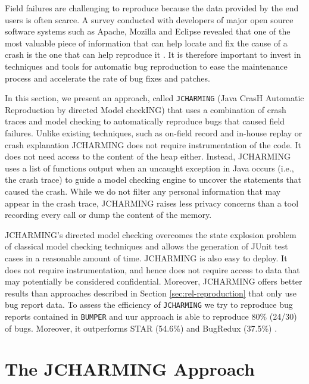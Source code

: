 

Field failures are challenging to reproduce because
the data provided by the end users is often scarce. A survey
conducted with developers of major open source software
systems such as Apache, Mozilla and Eclipse revealed that
one of the most valuable piece of information that can help
locate and fix the cause of a crash is the one that can help
reproduce it \cite{Bettenburg2008}. It is therefore important to invest in
techniques and tools for automatic bug reproduction to ease
the maintenance process and accelerate the rate of bug fixes
and patches.

In this section, we present an approach, called {\tt JCHARMING}
(Java CrasH Automatic Reproduction by directed Model
checkING) that uses a combination of crash traces and model
checking to automatically reproduce bugs that caused field
failures. Unlike existing techniques, such as on-field record and in-house replay \cite{Narayanasamy2005,Artzi2008,Jaygarl} or crash explanation \cite{Manevich2004,chandra2009snugglebug} JCHARMING does not
require instrumentation of the code. It does not need access to
the content of the heap either. Instead, JCHARMING uses a
list of functions output when an uncaught exception in Java
occurs (i.e., the crash trace) to guide a model checking engine
to uncover the statements that caused the crash. While we do not filter any personal information that may appear in the crash trace, JCHARMING  raises less privacy concerns than a tool recording every call or dump the content of the memory.

JCHARMING's directed model checking overcomes the state explosion problem of classical model checking techniques and allows the generation of JUnit test cases in a reasonable amount of time.
JCHARMING is also easy to deploy.
It does not require instrumentation, and hence does not require access to data that may potentially be considered confidential.
Moreover, JCHARMING offers better results than approaches described in Section \ref{sec:rel-reproduction} that only use bug report data.
To assess the efficiency of {\tt JCHARMING} we try to reproduce bug reports contained in {\tt BUMPER} and uur approach is able to reproduce 80\% (24/30) of bugs.
Moreover, it outperforms STAR (54.6\%) \cite{Chen2013} and BugRedux (37.5\%) \cite{Jin2012}.


\section{The JCHARMING Approach}

